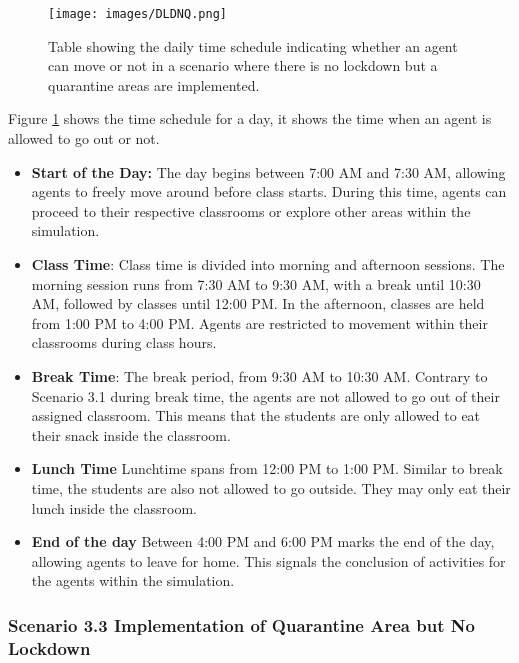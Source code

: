 \begin{figure}[H]
	\centering
	\texttt{[image: images/DLDNQ.png]}
	\caption{Table showing the daily time schedule indicating whether an agent can move or not in a scenario where there is no lockdown but a quarantine areas are implemented.}
	\label{3.2a} 
\end{figure}

Figure \ref{3.2a} shows the time schedule for a day, it shows the time when an agent is allowed to go out or not.


\begin{itemize}
	\item \textbf{Start of the Day:} The day begins between 7:00 AM and 7:30 AM, allowing agents to freely move around before class starts. During this time, agents can proceed to their respective classrooms or explore other areas within the simulation.
	
	\item \textbf{Class Time}: Class time is divided into morning and afternoon sessions. The morning session runs from 7:30 AM to 9:30 AM, with a break until 10:30 AM, followed by classes until 12:00 PM. In the afternoon, classes are held from 1:00 PM to 4:00 PM. Agents are restricted to movement within their classrooms during class hours.
	
	\item \textbf{Break Time}: The break period, from 9:30 AM to 10:30 AM. Contrary to Scenario 3.1 during break time, the agents are not allowed to go out of their assigned classroom. This means that the students are only allowed to eat their snack inside the classroom.
	
	\item \textbf{Lunch Time} Lunchtime spans from 12:00 PM to 1:00 PM. Similar to break time, the students are also not allowed to go outside. They may only eat their lunch inside the classroom. 
	
	\item \textbf{End of the day} Between 4:00 PM and 6:00 PM marks the end of the day, allowing agents to leave for home. This signals the conclusion of activities for the agents within the simulation.
\end{itemize}

\subsubsection{ Scenario 3.3 Implementation of Quarantine Area but No Lockdown}

